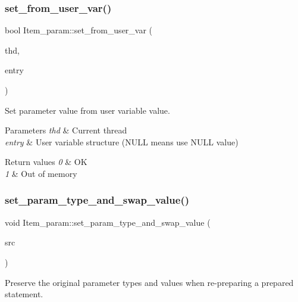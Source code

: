 \subsubsection{\texorpdfstring{set\+\_\+from\+\_\+user\+\_\+var()}{set\_from\_user\_var()}}
{\footnotesize\ttfamily bool Item\+\_\+param\+::set\+\_\+from\+\_\+user\+\_\+var (\begin{DoxyParamCaption}\item[{T\+HD $\ast$}]{thd,  }\item[{const user\+\_\+var\+\_\+entry $\ast$}]{entry }\end{DoxyParamCaption})}

Set parameter value from user variable value.


\begin{DoxyParams}{Parameters}
{\em thd} & Current thread \\
\hline
{\em entry} & User variable structure (N\+U\+LL means use N\+U\+LL value)\\
\hline
\end{DoxyParams}

\begin{DoxyRetVals}{Return values}
{\em 0} & OK \\
\hline
{\em 1} & Out of memory \\
\hline
\end{DoxyRetVals}
\mbox{\label{classItem__param_ae6192281918a2279fb0c2842b7d8e7cc}} 
\subsubsection{\texorpdfstring{set\+\_\+param\+\_\+type\+\_\+and\+\_\+swap\+\_\+value()}{set\_param\_type\_and\_swap\_value()}}
{\footnotesize\ttfamily void Item\+\_\+param\+::set\+\_\+param\+\_\+type\+\_\+and\+\_\+swap\+\_\+value (\begin{DoxyParamCaption}\item[{\mbox{\hyperlink{classItem__param}{Item\+\_\+param}} $\ast$}]{src }\end{DoxyParamCaption})}

Preserve the original parameter types and values when re-\/preparing a prepared statement.

